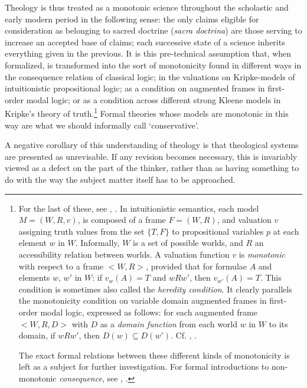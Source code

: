 \documentclass[]{amsart}
\begin{document}
Theology is thus treated as a monotonic science throughout the scholastic and early modern period in the following sense: the only claims eligible for consideration as belonging to sacred doctrine (\textit{sacra doctrina}) are those serving to increase an accepted base of claims; each successive state of a science inherits everything given in the previous. It is this pre-technical assumption that, when formalized, is transformed into the sort of monotonicity found in different ways in the consequence relation of classical logic; in the valuations on Kripke-models of intuitionistic propositional logic; as a condition on augmented frames in first-order modal logic; or as a condition across different strong Kleene models in Kripke's theory of truth.\footnote{For the last of these, see \cite[95-96]{Gupta2001}, \cite{Kripke1975}. In intuitionistic semantics, each model $M = (W, R, v) $, is composed of a frame $F = (W, R)$, and valuation $v$ assigning truth values from the set $\{T, F\}$ to propositional variables $p$ at each element $w$ in $W$. Informally, $W$ is a set of possible worlds, and $R$ an accessibility relation between worlds. A valuation function $v$ is \textit{monotonic} with respect to a frame $<W, R>$, provided that for formulae $A$ and elements $w$, $w'$ in $W$: if $v_{w}(A) = T$ and $wRw'$, then $v_{w'}(A) = T$. This condition is sometimes also called the \textit{heredity condition}. It clearly parallels the monotonicity condition on variable domain augmented frames in first-order modal logic, expressed as follows: for each augmented frame $<W, R, D>$ with $D$ as a \textit{domain function} from each world $w$ in $W$ to its domain, if $wRw'$, then $D(w) \subseteq D(w')$. Cf. \cite[105, 422-424]{Priest2008}, \cite[110-112]{Fitting1998}.

The exact formal relations between these different kinds of monotonicity is left as a subject for further investigation. For formal introductions to  non-monotonic \textit{consequence}, see \cite{Horty2001}, \cite{Strasser2014}.} Formal theories whose models are monotonic in this way are what we should informally call ‘conservative'.

A negative corollary of this understanding of theology is that theological systems are presented as unrevisable. If any revision becomes necessary, this is invariably viewed as a defect on the part of the thinker, rather than as having something to do with the way the subject matter itself has to be approached.
\end{document}
